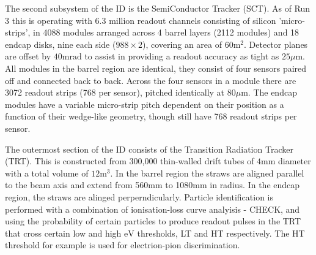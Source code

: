 The second subsystem of the ID is the SemiConductor Tracker (SCT). As of Run 3 this is operating with 6.3 million readout channels consisting of silicon 'micro-strips', in 4088 modules arranged across 4 barrel layers (2112 modules) and 18 endcap disks, nine each side ($988\times 2$), covering an area of $60\text{m}^{2}$. Detector planes are offset by $40\text{mrad}$ to assist in providing a readout accuracy as tight as $25\mu\text{m}$. All modules in the barrel region are identical, they consist of four sensors paired off and connected back to back. Across the four sensors in a module there are 3072 readout strips (768 per sensor), pitched identically at $80\mu\text{m}$. The endcap modules have a variable micro-strip pitch dependent on their position as a function of their wedge-like geometry, though still have 768 readout strips per sensor.

The outermost section of the ID consists of the Transition Radiation Tracker (TRT). This is constructed from 300,000 thin-walled drift tubes of $4\text{mm}$ diameter with a total volume of $12\text{m}^{3}$. In the barrel region the straws are aligned parallel to the beam axis and extend from 560mm to 1080mm in radius. In the endcap region, the straws are alinged perperndicularly. Particle identification is performed with a combination of ionisation-loss curve analyisis - CHECK, and using the probability of certain particles to produce readout pulses in the TRT that cross certain low and high $\text{eV}$ thresholds, LT and HT respectively. The HT threshold for example is used for electrion-pion discrimination. 





